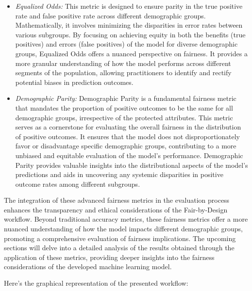 \documentclass[12pt,a4paper,openright,twoside]{book}
\begin{document}
\begin{itemize}

    \item \emph{Equalized Odds:} This metric is designed to ensure parity in the true positive rate and false positive rate across different demographic groups. Mathematically, it involves minimizing the disparities in error rates between various subgroups. By focusing on achieving equity in both the benefits (true positives) and errors (false positives) of the model for diverse demographic groups, Equalized Odds offers a nuanced perspective on fairness. It provides a more granular understanding of how the model performs across different segments of the population, allowing practitioners to identify and rectify potential biases in prediction outcomes.
    
    \item \emph{Demographic Parity:} Demographic Parity is a fundamental fairness metric that mandates the proportion of positive outcomes to be the same for all demographic groups, irrespective of the protected attributes. This metric serves as a cornerstone for evaluating the overall fairness in the distribution of positive outcomes. It ensures that the model does not disproportionately favor or disadvantage specific demographic groups, contributing to a more unbiased and equitable evaluation of the model's performance. Demographic Parity provides valuable insights into the distributional aspects of the model's predictions and aids in uncovering any systemic disparities in positive outcome rates among different subgroups.

\end{itemize}
The integration of these advanced fairness metrics in the evaluation process enhances the transparency and ethical considerations of the Fair-by-Design workflow. Beyond traditional accuracy metrics, these fairness metrics offer a more nuanced understanding of how the model impacts different demographic groups, promoting a comprehensive evaluation of fairness implications. The upcoming sections will delve into a detailed analysis of the results obtained through the application of these metrics, providing deeper insights into the fairness considerations of the developed machine learning model.

Here's the graphical representation of the presented workflow:
\end{document}
